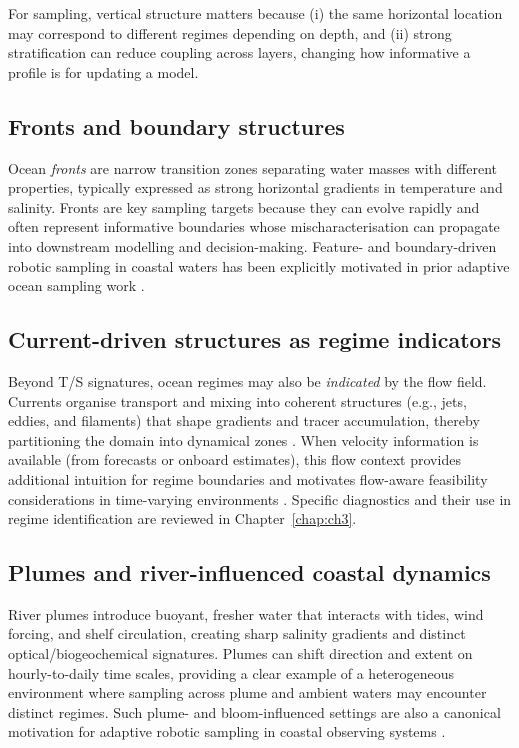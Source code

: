 For sampling, vertical structure matters because (i) the same horizontal location may correspond to
different regimes depending on depth, and (ii) strong stratification can reduce coupling across layers,
changing how informative a profile is for updating a model.

\subsection{Fronts and boundary structures}
Ocean \emph{fronts} are narrow transition zones separating water masses with different properties,
typically expressed as strong horizontal gradients in temperature and salinity. Fronts are key
sampling targets because they can evolve rapidly and often represent informative boundaries whose
mischaracterisation can propagate into downstream modelling and decision-making. Feature- and
boundary-driven robotic sampling in coastal waters has been explicitly motivated in prior adaptive
ocean sampling work \parencite{fossum2019phytoplankton}.

\subsection{Current-driven structures as regime indicators}
Beyond T/S signatures, ocean regimes may also be \emph{indicated} by the flow field. Currents organise transport and
mixing into coherent structures (e.g., jets, eddies, and filaments) that shape gradients and tracer accumulation,
thereby partitioning the domain into dynamical zones \parencite{weiss2007transportmixing,mcgillicuddy2016mechanisms,mahadevan2016submesoscale}.
When velocity information is available (from forecasts or onboard estimates), this flow context provides additional
intuition for regime boundaries and motivates flow-aware feasibility considerations in time-varying environments
\parencite{aguiar2018trajectoryopt}. Specific diagnostics and their use in regime identification are reviewed in
Chapter~\ref{chap:ch3}.






\subsection{Plumes and river-influenced coastal dynamics}
River plumes introduce buoyant, fresher water that interacts with tides, wind forcing, and shelf
circulation, creating sharp salinity gradients and distinct optical/biogeochemical signatures.
Plumes can shift direction and extent on hourly-to-daily time scales, providing a clear example of a
heterogeneous environment where sampling across plume and ambient waters may encounter distinct regimes.
Such plume- and bloom-influenced settings are also a canonical motivation for adaptive robotic sampling
in coastal observing systems \parencite{fossum2019phytoplankton}.

